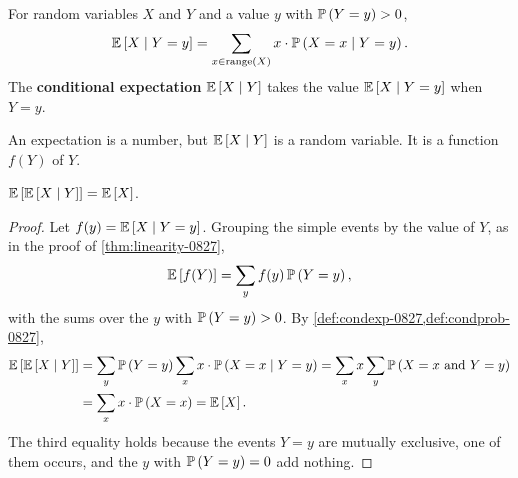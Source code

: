 \begin{definition}\label{def:condexp-0827}
    For random variables $X$ and $Y$ and a value $y$ with $\prob{Y = y} > 0$,
    \[\expectation{X \given Y = y} = \sum_{x \in \operatorname{range}(X)} x \cdot \prob{X = x \given Y = y}.\]
    The \textbf{conditional expectation} $\expectation{X \given Y}$ takes the value
    $\expectation{X \given Y = y}$ when $Y = y$.
\end{definition}

An expectation is a number, but $\expectation{X \given Y}$ is a random variable. It is a function
$f(Y)$ of $Y$.

\begin{theorem}\label{thm:tower-0827}
    $\expectation{\expectation{X \given Y}} = \expectation{X}$.
\end{theorem}

\begin{proof}
    Let $f(y) = \expectation{X \given Y = y}$. Grouping the simple events by the value of $Y$, as in
    the proof of \cref{thm:linearity-0827},
    \[\expectation{f(Y)} = \sum_{y} f(y) \prob{Y = y},\]
    with the sums over the $y$ with $\prob{Y = y} > 0$. By
    \cref{def:condexp-0827,def:condprob-0827},
    \begin{align*}
        \expectation{\expectation{X \given Y}}
         & = \sum_{y} \prob{Y = y} \sum_{x} x \cdot \prob{X = x \given Y = y}
        = \sum_{x} x \sum_{y} \prob{X = x \text{ and } Y = y}                  \\
         & = \sum_{x} x \cdot \prob{X = x} = \expectation{X}.
    \end{align*}
    The third equality holds because the events $Y = y$ are mutually exclusive, one of them
    occurs, and the $y$ with $\prob{Y = y} = 0$ add nothing.
\end{proof}

